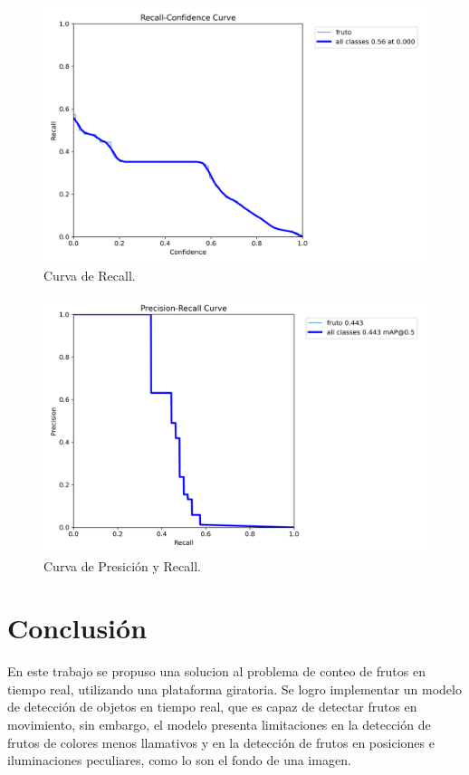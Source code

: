 \documentclass[conference]{IEEEtran}
\begin{document}
\begin{figure}[ht]
    \centering
    \includegraphics[width=\columnwidth]{images/R_curve.png}
    \caption{Curva de Recall.}
    \label{fig:R_curve}
\end{figure}

\begin{figure}[ht]
    \centering
    \includegraphics[width=\columnwidth]{images/PR_curve.png}
    \caption{Curva de Presición y Recall.}
    \label{fig:PR_curve}
\end{figure}


\section{Conclusión}
En este trabajo se propuso una solucion al problema de conteo de frutos en tiempo real, utilizando una plataforma giratoria. Se logro implementar un modelo de detección de objetos en tiempo real, que es capaz de detectar frutos en movimiento, sin embargo, el modelo presenta limitaciones en la detección de frutos de colores menos llamativos y en la detección de frutos en posiciones e iluminaciones peculiares, como lo son el fondo de una imagen.


\nocite{calcularRangos}
\printbibliography
\end{document}
